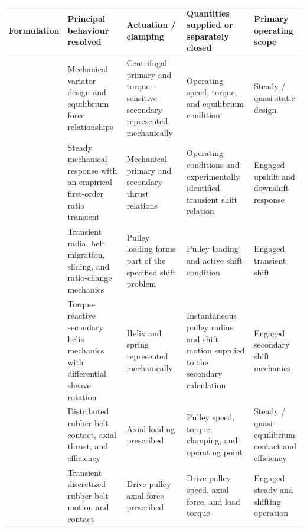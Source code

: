\documentclass[11pt]{report}
\numberwithin{equation}{section}
\begin{document}
\clearpage
\begin{table}[H]
\centering
\small
\renewcommand{\arraystretch}{1.22}
\begin{tabular}{
>{\raggedright\arraybackslash}p{}
>{\raggedright\arraybackslash}p{}
>{\raggedright\arraybackslash}p{}
>{\raggedright\arraybackslash}p{}
>{\raggedright\arraybackslash}p{}}
\hline
\textbf{Formulation} &
\textbf{Principal behaviour resolved} &
\textbf{Actuation / clamping} &
\textbf{Quantities supplied or separately closed} &
\textbf{Primary operating scope} \\[3pt]
\hline

\citet{Cammalleri2005} &
Mechanical variator design and equilibrium force relationships &
Centrifugal primary and torque-sensitive secondary represented mechanically &
Operating speed, torque, and equilibrium condition &
Steady / quasi-static design \\[6pt]

\citet{KimEtAl2002} &
Steady mechanical response with an empirical first-order ratio transient &
Mechanical primary and secondary thrust relations &
Operating conditions and experimentally identified transient shift relation &
Engaged upshift and downshift response \\[6pt]

\citet{Sorge2008} &
Transient radial belt migration, sliding, and ratio-change mechanics &
Pulley loading forms part of the specified shift problem &
Pulley loading and active shift condition &
Engaged transient shift \\[6pt]

\citet{SorgeCammalleri2011} &
Torque-reactive secondary helix mechanics with differential sheave rotation &
Helix and spring represented mechanically &
Instantaneous pulley radius and shift motion supplied to the secondary calculation &
Engaged secondary shift mechanics \\[6pt]

\citet{Messick2018} &
Distributed rubber-belt contact, axial thrust, and efficiency &
Axial loading prescribed &
Pulley speed, torque, clamping, and operating point &
Steady / quasi-equilibrium contact and efficiency \\[6pt]

\citet{JulioPlante2011} &
Transient discretized rubber-belt motion and contact &
Drive-pulley axial force prescribed &
Drive-pulley speed, axial force, and load torque &
Engaged steady and shifting operation \\[6pt]


\end{tabular}
\end{table}
\end{document}
